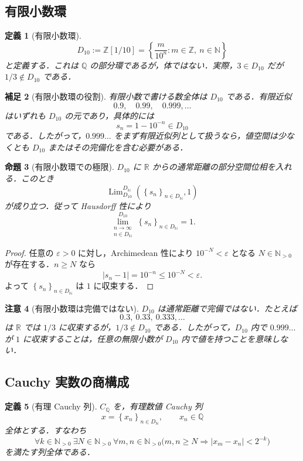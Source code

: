 \documentclass[a4paper,11pt]{ltjsarticle}
\theoremstyle{jpdef}
\newtheorem{definition}{定義}[section]
\newtheorem{remark}[definition]{補足}
\newtheorem{warning}[definition]{注意}
\theoremstyle{jpthm}
\newtheorem{proposition}[definition]{命題}
\newcommand{\N}{\mathbb{N}}
\newcommand{\Z}{\mathbb{Z}}
\newcommand{\Q}{\mathbb{Q}}
\newcommand{\R}{\mathbb{R}}
\newcommand{\Lim}{\operatorname{Lim}}
\newcommand{\Ns}{\N_{>0}}
\newcommand{\DN}{D_{\N}}
\newcommand{\set}[1]{\left\{#1\right\}}
\newcommand{\seq}[2]{\left\{#1\right\}_{#2}}
\newcommand{\eps}{\varepsilon}
\begin{document}
\subsection{有限小数環}

\begin{definition}[有限小数環]
\[
  D_{10}:=\Z[1/10]
  =\set{\frac{m}{10^n}:m\in\Z,\ n\in\N}
\]
と定義する．これは \(\Q\) の部分環であるが，体ではない．実際，\(3\in D_{10}\) だが \(1/3\notin D_{10}\) である．
\end{definition}

\begin{remark}[有限小数環の役割]
有限小数で書ける数全体は \(D_{10}\) である．有限近似
\[
  0.9,\quad 0.99,\quad 0.999,\ldots
\]
はいずれも \(D_{10}\) の元であり，具体的には
\[
  s_n=1-10^{-n}\in D_{10}
\]
である．したがって，\(0.999\ldots\) をまず有限近似列として扱うなら，値空間は少なくとも \(D_{10}\) またはその完備化を含む必要がある．
\end{remark}

\begin{proposition}[有限小数環での極限]
\(D_{10}\) に \(\R\) からの通常距離の部分空間位相を入れる．このとき
\[
  \Lim_{D_{10}}^{\DN}(\seq{s_n}{n\in\DN},1)
\]
が成り立つ．従って Hausdorff 性により
\[
  \lim_{\substack{n\to\infty\\ n\in\DN}}^{D_{10}}\seq{s_n}{n\in\DN}=1.
\]
\end{proposition}

\begin{proof}
任意の \(\eps>0\) に対し，Archimedean 性により \(10^{-N}<\eps\) となる \(N\in\Ns\) が存在する．\(n\ge N\) なら
\[
  |s_n-1|=10^{-n}\le 10^{-N}<\eps.
\]
よって \(\seq{s_n}{n\in\DN}\) は \(1\) に収束する．
\end{proof}

\begin{warning}[有限小数環は完備ではない]
\(D_{10}\) は通常距離で完備ではない．たとえば
\[
  0.3,\ 0.33,\ 0.333,\ldots
\]
は \(\R\) では \(1/3\) に収束するが，\(1/3\notin D_{10}\) である．したがって，\(D_{10}\) 内で \(0.999\ldots\) が \(1\) に収束することは，任意の無限小数が \(D_{10}\) 内で値を持つことを意味しない．
\end{warning}

\subsection{Cauchy 実数の商構成}

\begin{definition}[有理 Cauchy 列]
\(C_\Q\) を，有理数値 Cauchy 列
\[
  x=\seq{x_n}{n\in\DN},\qquad x_n\in\Q
\]
全体とする．すなわち
\[
  \forall k\in\Ns\ \exists N\in\Ns\ \forall m,n\in\Ns
  \bigl(m,n\ge N\Rightarrow |x_m-x_n|<2^{-k}\bigr)
\]
を満たす列全体である．
\end{definition}
\end{document}
